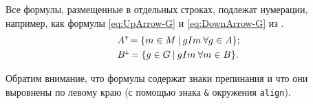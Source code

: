 	Все формулы, размещенные в отдельных строках, подлежат нумерации, например, как формулы \eqref{eq:UpArrow-G} и \eqref{eq:DownArrow-G} из \cite{Ganter1999}. 
	\begin{align}
	\label{eq:UpArrow-G}
	& A{}^{\scriptscriptstyle\bm{{\uparrow\mkern-12mu}}} =  \{ m\in{}M\:|\:gIm\:\forall  g \in{} A \}; \\ 
	\label{eq:DownArrow-G}
	& B{}^{\scriptscriptstyle\bm{\downarrow\mkern-2mu}} =  \{ g\in{}G\:|\:gIm\:\forall  m \in{} B \}.
	\end{align}

Обратим внимание, что формулы содержат знаки препинания и что они выровнены по левому краю (с помощью знака \verb|&| окружения \texttt{align}).